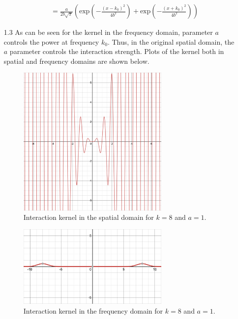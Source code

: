 \documentclass[12pt]{article}
\begin{document}
\begin{enumerate}
\begin{align*}
                           &= \frac{a}{2b\sqrt{\pi}}\left( \text{exp}\left(-\frac{(x-k_{0})^2}{4b^{2}}\right) + \text{exp}\left(-\frac{(x+k_{0})^2}{4b^{2}}\right)\right)
\end{align*}
\item[1.3] As can be seen for the kernel in the frequency domain, parameter $a$ controls the power at frequency $k_0$. Thus, in the original spatial domain, the $a$ parameter controls the interaction strength. 
Plots of the kernel both in spatial and frequency domains are shown below. 
\begin{figure}[H]
    \centering
    \includegraphics[width=0.7\textwidth]{./k8a1.png}
    \caption{Interaction kernel in the spatial domain for $k=8$ and $a=1$.}
\end{figure}
\begin{figure}[H]
    \centering
    \includegraphics[width=0.7\textwidth]{./a1.png}
    \caption{Interaction kernel in the frequency domain for $k=8$ and $a=1$.}
\end{figure}
\begin{figure}[H]
    \centering

\end{figure}
\end{enumerate}
\end{document}
